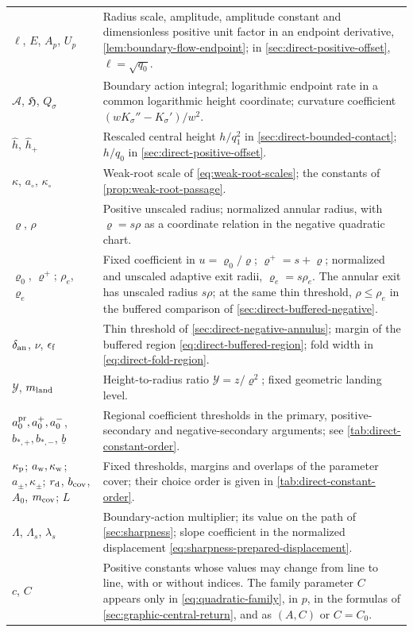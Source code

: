 \begin{longtable}{@{}>{\raggedright\arraybackslash}p{}
                >{\raggedright\arraybackslash}p{}@{}}
\(\ell\), \(E\), \(A_p\), \(U_p\)
  & Radius scale, amplitude, amplitude constant and dimensionless
    positive unit factor in an endpoint derivative,
    \cref{lem:boundary-flow-endpoint}; in
    \cref{sec:direct-positive-offset}, \(\ell=\sqrt{q_0}\).\\
\(\mathcal A\), \(\mathfrak H\), \(Q_\sigma\)
  & Boundary action integral; logarithmic endpoint rate in a common
    logarithmic height coordinate; curvature coefficient
    \((wK_\sigma''-K_\sigma')/w^2\).\\
\(\widehat h\), \(\widehat h_+\)
  & Rescaled central height \(h/q_1^2\) in
    \cref{sec:direct-bounded-contact}; \(h/q_0\) in
    \cref{sec:direct-positive-offset}.\\
\(\kappa\), \(a_\circ\), \(\kappa_\circ\)
  & Weak-root scale of \eqref{eq:weak-root-scales}; the constants of
    \cref{prop:weak-root-passage}.\\
\(\varrho\), \(\rho\)
  & Positive unscaled radius; normalized annular radius, with
    \(\varrho=s\rho\) as a coordinate relation in the negative quadratic
    chart.\\
\(\varrho_0\), \(\varrho^+\); \(\rho_e\), \(\varrho_e\)
  & Fixed coefficient in \(u=\varrho_0/\varrho\); \(\varrho^+=s+\varrho\);
    normalized and unscaled adaptive exit radii, \(\varrho_e=s\rho_e\).
    The annular exit has unscaled radius \(s\rho\); at the same thin
    threshold, \(\rho\le\rho_e\) in the buffered comparison of
    \cref{sec:direct-buffered-negative}.\\
\(\delta_{\rm an}\), \(\nu\), \(\epsilon_{\rm f}\)
  & Thin threshold of \cref{sec:direct-negative-annulus}; margin of the
    buffered region \eqref{eq:direct-buffered-region}; fold width in
    \eqref{eq:direct-fold-region}.\\
\(\mathcal Y\), \(m_{\rm land}\)
  & Height-to-radius ratio \(\mathcal Y=z/\varrho^2\); fixed geometric
    landing level.\\
\(a_0^{\rm pr},a_0^+,a_0^-\), \(b_{*,+},b_{*,-}\), \(\underline b\)
  & Regional coefficient thresholds in the primary, positive-secondary
    and negative-secondary arguments; see \cref{tab:direct-constant-order}.\\
\(\kappa_{\rm p}\); \(a_{\rm w},\kappa_{\rm w}\); \(a_\pm,\kappa_\pm\);
\(r_{\rm d}\), \(b_{\rm cov}\), \(A_0\), \(m_{\rm cov}\); \(L\)
  & Fixed thresholds, margins and overlaps of the parameter cover;
    their choice order is given in \cref{tab:direct-constant-order}.\\
\(\Lambda\), \(\Lambda_s\), \(\lambda_s\)
  & Boundary-action multiplier; its value on the path of
    \cref{sec:sharpness}; slope coefficient in the normalized
    displacement \eqref{eq:sharpness-prepared-displacement}.\\
\(c\), \(C\)
  & Positive constants whose values may change from line to line, with
    or without indices. The family parameter \(C\) appears only in
    \eqref{eq:quadratic-family}, in \(p\), in the formulas of
    \cref{sec:graphic-central-return}, and as \((A,C)\) or
    \(C=C_0\).\\
\hline
\end{longtable}
\endgroup
